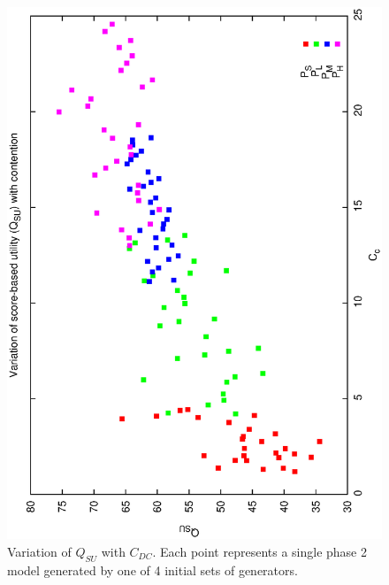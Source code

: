 \begin{figure}[h]
\begin{center}
 \includegraphics[scale=0.5, angle=-90]{figures/p2_gen_qsu.eps}
 \caption[Variation of $Q_{SU}$ with $C_{DC}$ for variable phase2 generator models.] 
   {Variation of $Q_{SU}$ with $C_{DC}$. Each point represents a single phase 2 model generated by one of 4 initial sets of generators.}
\label{fig:p2_gen_su}
\end{center}
\end{figure}


